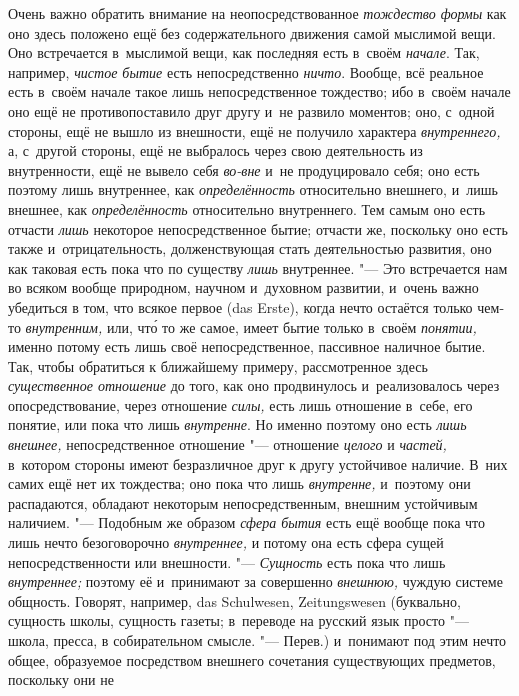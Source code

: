 Очень важно обратить внимание на неопосредствованное
{\em тождество формы} как оно здесь положено ещё без
содержательного движения самой мыслимой вещи. Оно встречается в~мыслимой
вещи, как последняя есть в~своём {\em начале}. Так,
например, {\em чистое бытие} есть непосредственно
{\em ничто}. Вообще, всё реальное есть в~своём начале
такое лишь непосредственное тождество; ибо в~своём начале оно ещё не
противопоставило друг другу и~не развило моментов; оно, с~одной стороны,
ещё не вышло из внешности, ещё не получило характера
{\em внутреннего,} а, с~другой стороны, ещё не
выбралось через свою деятельность из внутренности, ещё не вывело себя
{\em во-вне} и~не продуцировало себя; оно есть поэтому
лишь внутреннее, как {\em определённость} относительно
внешнего, и~лишь внешнее, как {\em определённость}
относительно внутреннего. Тем самым оно есть отчасти
{\em лишь} некоторое непосредственное бытие; отчасти
же, поскольку оно есть также и~отрицательность, долженствующая стать
деятельностью развития, оно как таковая есть пока что по существу
{\em лишь} внутреннее. "--- Это встречается нам во всяком
вообще природном, научном и~духовном развитии, и~очень важно убедиться в
том, что всякое первое (das Erste), когда нечто остаётся только чем-то
{\em внутренним,} или, чт\'{о} то же самое, имеет бытие
только в~своём {\em понятии,} именно потому есть лишь
своё непосредственное, пассивное наличное бытие. Так, чтобы обратиться к
ближайшему примеру, рассмотренное здесь
{\em существенное отношение} до того, как оно
продвинулось и~реализовалось через опосредствование, через отношение
{\em силы,} есть лишь отношение в~себе, его понятие,
или пока что лишь {\em внутренне}. Но именно поэтому
оно есть {\em лишь внешнее,} непосредственное отношение
"--- отношение {\em целого} и
{\em частей,} в~котором стороны имеют безразличное друг
к другу устойчивое наличие. В~них самих ещё нет их тождества; оно пока что
лишь {\em внутренне,} и~поэтому они распадаются,
обладают некоторым непосредственным, внешним устойчивым наличием. "---
Подобным же образом {\em сфера бытия} есть ещё вообще
пока что лишь нечто безоговорочно {\em внутреннее,} и
потому она есть сфера сущей непосредственности или внешности. "---
{\em Сущность} есть пока что лишь
{\em внутреннее;} поэтому её и~принимают за совершенно
{\em внешнюю,} чуждую системе общность. Говорят,
например, das Schulwesen, Zeitungs\-wesen (буквально, сущность школы,
сущность газеты; в~переводе на русский язык просто "--- школа, пресса, в
собирательном смысле. "--- Перев.) и~понимают под этим нечто общее, образуемое
посредством внешнего сочетания существующих предметов, поскольку они не
